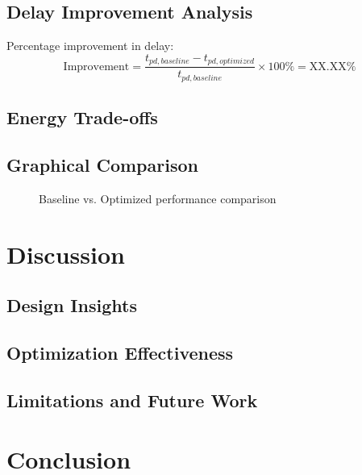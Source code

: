 \documentclass[12pt,letterpaper]{article}
\begin{document}
\subsection{Delay Improvement Analysis}

Percentage improvement in delay:
\begin{equation}
\text{Improvement} = \frac{t_{pd,baseline} - t_{pd,optimized}}{t_{pd,baseline}} \times 100\% = \text{XX.XX\%}
\end{equation}

\subsection{Energy Trade-offs}


\subsection{Graphical Comparison}

\begin{figure}[H]
    \centering
    \caption{Baseline vs. Optimized performance comparison}
    \label{fig:comparison}
\end{figure}

\section{Discussion}
\label{sec:discussion}


\subsection{Design Insights}

\subsection{Optimization Effectiveness}

\subsection{Limitations and Future Work}

\section{Conclusion}
\label{sec:conclusion}

\end{document}
